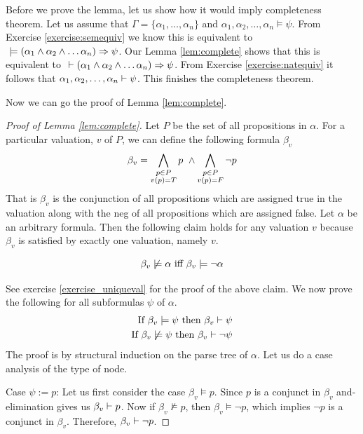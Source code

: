 Before we prove the lemma, let us show how it would imply completeness theorem. Let us assume that $\Gamma = \{\alpha_1,\dots,\alpha_n\}$ and $\alpha_1,\alpha_2,\dots, \alpha_n \models \psi$.  From Exercise \ref{exercise:semequiv} we know this is equivalent to \true $~\models (\alpha_1 \wedge \alpha_2 \wedge \dots \alpha_n) \Rightarrow \psi$. Our Lemma \ref{lem:complete} shows that this is equivalent to \true $~\vdash (\alpha_1 \wedge \alpha_2 \wedge \dots \alpha_n) \Rightarrow \psi$. From Exercise \ref{exercise:natequiv} it follows that $\alpha_1,\alpha_2,\dots,\alpha_n \vdash \psi$. This finishes the completeness theorem.

Now we can go the proof of Lemma \ref{lem:complete}.
\begin{proof} [Proof of Lemma \ref{lem:complete}]
Let $P$ be the set of all propositions in $\alpha$. For a particular valuation, $v$ of $P$, we can define the following formula $\beta_v$ 
\[
\beta_v = \bigwedge_{\substack{p \in P \\ v(p) = T}} p ~\wedge \bigwedge_{\substack{p \in P \\ v(p) = F}} \neg p
\]
That is $\beta_v$ is the conjunction of all propositions which are assigned true in the valuation along with the neg of all propositions which are assigned false. Let $\alpha$ be an arbitrary formula. Then the following claim holds for any valuation $v$ because $\beta_v$ is satisfied by exactly one valuation, namely $v$. 
\begin{claim}
\[\beta_v \not \models \alpha \mbox{ iff } \beta_v \models \neg \alpha\]
\end{claim}
See exercise \ref{exercise_uniqueval} for the proof of the above claim. We now prove the following for all subformulas $\psi$ of $\alpha$.
\begin{align}
\text{If } \beta_v \models \psi \text{ then } \beta_v \vdash \psi \nonumber \\
\text{If } \beta_v \not \models \psi \text{ then } \beta_v \vdash \neg \psi 
\label{align:induction}
\end{align}
The proof is by structural induction on the parse tree of $\alpha$. Let us do a case analysis of the type of node.

Case $\psi := p$: Let us first consider the case $\beta_v \models p$. Since $p$ is a conjunct in $\beta_v$ and-elimination gives us $\beta_v \vdash p$. Now if $\beta_v \not \models p$, then $\beta_v \models \neg p$, which implies $\neg p$ is a conjunct in $\beta_v$. Therefore, $\beta_v \vdash \neg p$.


\end{proof}
